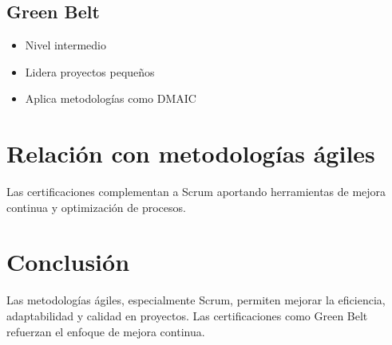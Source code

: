 \documentclass{llncs}
\begin{document}
\subsection{Green Belt}
\begin{itemize}
\item Nivel intermedio
\item Lidera proyectos pequeños
\item Aplica metodologías como DMAIC
\end{itemize}

\section{Relación con metodologías ágiles}
Las certificaciones complementan a Scrum aportando herramientas de mejora continua y optimización de procesos.

\section{Conclusión}
Las metodologías ágiles, especialmente Scrum, permiten mejorar la eficiencia, adaptabilidad y calidad en proyectos. Las certificaciones como Green Belt refuerzan el enfoque de mejora continua.
\end{document}
